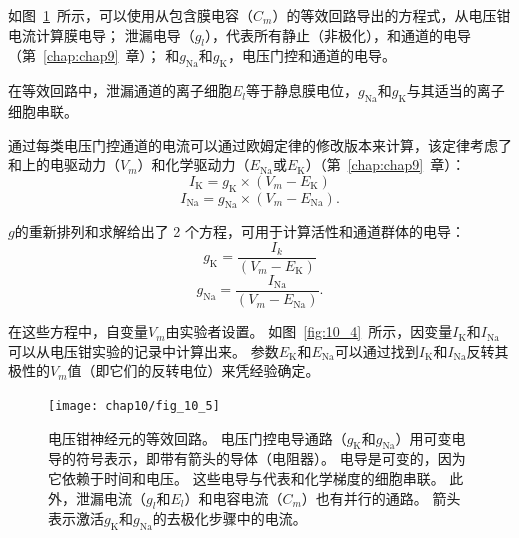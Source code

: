 \begin{proposition}[从电压钳数据计算膜电导] \label{box:10_2}
	
	\quad \quad 如图~\ref{fig:10_5}~所示，可以使用从包含膜电容（$C_m$）的等效回路导出的方程式，从电压钳电流计算膜电导；
	泄漏电导（$g_l$），代表所有静止（非极化），和通道的电导（第~\ref{chap:chap9}~章）；
	和$g_\text{Na}$和$g_\text{K}$，电压门控和通道的电导。
	
	\quad \quad 在等效回路中，泄漏通道的离子细胞$E_l$等于静息膜电位，$g_\text{Na}$和$g_\text{K}$与其适当的离子细胞串联。
	
	\quad \quad 通过每类电压门控通道的电流可以通过欧姆定律的修改版本来计算，该定律考虑了和上的电驱动力（$V_m$）和化学驱动力（$E_{\text{Na}}$或$E_\text{K}$）（第~\ref{chap:chap9}~章）：
	\begin{equation}
		I_\text{K} = g_\text{K} \times (V_m - E_\text{K})
	\end{equation}
	\begin{equation}
		I_\text{Na} = g_\text{Na} \times (V_m - E_{\text{Na}}).
	\end{equation}
	
	\quad \quad $g$的重新排列和求解给出了 2 个方程，可用于计算活性和通道群体的电导：
	\begin{equation}
		g_\text{K} = \frac{I_k}{(V_m - E_\text{K})}
	\end{equation}
	\begin{equation}
		g_\text{Na} = \frac{I_\text{Na}}{(V_m - E_{\text{Na}})}.
	\end{equation}
	
	\quad \quad 在这些方程中，自变量$V_m$由实验者设置。
	如图~\ref{fig:10_4}~所示，因变量$I_\text{K}$和$I_\text{Na}$可以从电压钳实验的记录中计算出来。
	参数$E_\text{K}$和$E_{\text{Na}}$可以通过找到$I_\text{K}$和$I_\text{Na}$反转其极性的$V_m$值（即它们的反转电位）来凭经验确定。
	
\end{proposition}


\begin{figure}[htbp]
	\centering
	\texttt{[image: chap10/fig\_10\_5]}
	\caption{电压钳神经元的等效回路。
		电压门控电导通路（$g_\text{K}$和$g_\text{Na}$）用可变电导的符号表示，即带有箭头的导体（电阻器）。
		电导是可变的，因为它依赖于时间和电压。
		这些电导与代表和化学梯度的细胞串联。
		此外，泄漏电流（$g_l$和$E_l$）和电容电流（$C_m$）也有并行的通路。
		箭头表示激活$g_\text{K}$和$g_\text{Na}$的去极化步骤中的电流。}
	\label{fig:10_5}
\end{figure}


